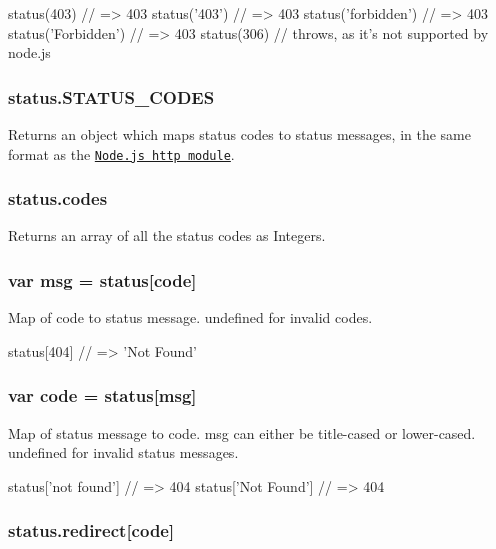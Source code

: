 \begin{DoxyCode}
status(403) // => 403
status('403') // => 403
status('forbidden') // => 403
status('Forbidden') // => 403
status(306) // throws, as it's not supported by node.js
\end{DoxyCode}


\subsubsection*{status.\+S\+T\+A\+T\+U\+S\+\_\+\+C\+O\+D\+ES}

Returns an object which maps status codes to status messages, in the same format as the \href{https://nodejs.org/dist/latest/docs/api/http.html#http_http_status_codes}{\tt Node.\+js http module}.

\subsubsection*{status.\+codes}

Returns an array of all the status codes as {\ttfamily Integer}s.

\subsubsection*{var msg = status\mbox{[}code\mbox{]}}

Map of {\ttfamily code} to {\ttfamily status message}. {\ttfamily undefined} for invalid {\ttfamily code}s.


\begin{DoxyCode}
status[404] // => 'Not Found'
\end{DoxyCode}


\subsubsection*{var code = status\mbox{[}msg\mbox{]}}

Map of {\ttfamily status message} to {\ttfamily code}. {\ttfamily msg} can either be title-\/cased or lower-\/cased. {\ttfamily undefined} for invalid {\ttfamily status message}s.


\begin{DoxyCode}
status['not found'] // => 404
status['Not Found'] // => 404
\end{DoxyCode}


\subsubsection*{status.\+redirect\mbox{[}code\mbox{]}}

